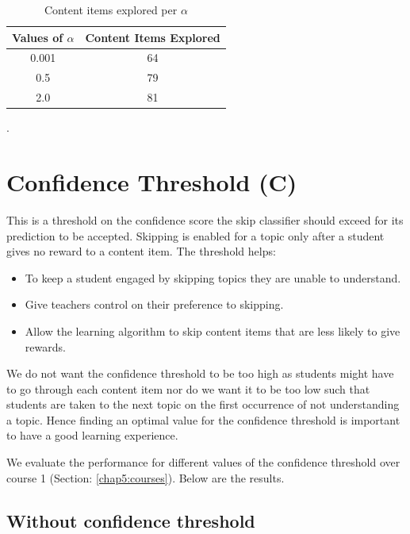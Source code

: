 \begin{table}[h]
    \centering
 \begin{tabular}{|c|c|}
    \hline
    \textrm{\textbf{Values of $\alpha$}} & \textrm{\textbf{Content Items Explored}} \\ \hline
     \textrm{0.001} & \textrm{64}\\ \hline
     \textrm{0.5} & \textrm{79}\\ \hline
     \textrm{2.0} & \textrm{81}\\ \hline
    \end{tabular}
    \caption{Content items explored per $\alpha$}   \label{chap6:content_items_for_alpha_without_penalty}
\end{table}. 

\section{Confidence Threshold (C)
\label{chap6:threshold}}

This is a threshold on the confidence score the skip classifier should exceed for its prediction to be accepted. Skipping is enabled for a topic only after a student gives no reward to a content item. The threshold helps: 
\begin{itemize}
\item To keep a student engaged by skipping topics they are unable to understand.
\item Give teachers control on their preference to skipping. 
\item Allow the learning algorithm to skip content items that are less likely to give rewards.
\end{itemize}
 
We do not want the confidence threshold to be too high as students might have to go through each content item nor do we want it to be too low such that students are taken to the next topic on the first occurrence of not understanding a topic. Hence finding an optimal value for the confidence threshold is important to have a good learning experience. 

We evaluate the performance for different values of the confidence threshold over course 1 (Section: \ref{chap5:courses}). Below are the results. 

\subsection{Without confidence threshold} 

